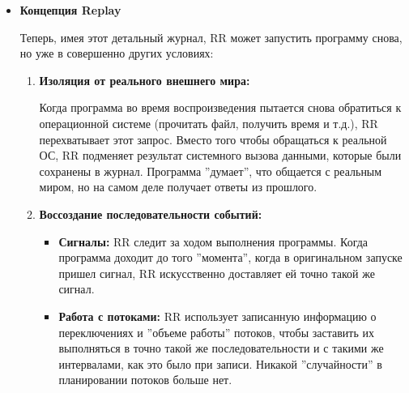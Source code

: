 \begin{itemize}
\begin{enumerate}
\begin{itemize}
          \item \textbf{Отслеживание некоторых внутренних непредсказуемостей:}

          Некоторые процессорные инструкции могут давать разные результаты (например, генерация случайных чисел). 
          RR также старается зафиксировать результаты таких операций.
        \end{itemize}

        В итоге получается некий ''журнал'' всех внешних воздействий и внутренних непредсказуемых событий,
        который можно использовать для воспроизведения программы.
    
    \end{enumerate}
  
  \item \textbf{Концепция Replay}

    Теперь, имея этот детальный журнал, RR может запустить программу снова, но уже в совершенно других условиях:
    \begin{enumerate}

      \item \textbf{Изоляция от реального внешнего мира:} 
      
      Когда программа во время воспроизведения пытается снова обратиться к
      операционной системе (прочитать файл, получить время и т.д.), RR
      перехватывает этот запрос. Вместо того чтобы обращаться к реальной ОС, RR
      подменяет результат системного вызова данными, которые были сохранены в
      журнал. Программа ''думает'', что общается с реальным миром, но на самом
      деле получает ответы из прошлого.

      \item \textbf{Воссоздание последовательности событий:}
      
      \begin{itemize}

        \item \textbf{Сигналы:} RR следит за ходом выполнения программы. Когда
        программа доходит до того ''момента'', когда в оригинальном запуске
        пришел сигнал, RR искусственно доставляет ей точно такой же сигнал.

        \item \textbf{Работа с потоками:} RR использует записанную информацию о
        переключениях и ''объеме работы'' потоков, чтобы заставить их выполняться
        в точно такой же последовательности и с такими же интервалами, как это
        было при записи. Никакой ''случайности'' в планировании потоков больше
        нет.


\end{itemize}
\end{enumerate}
\end{itemize}
